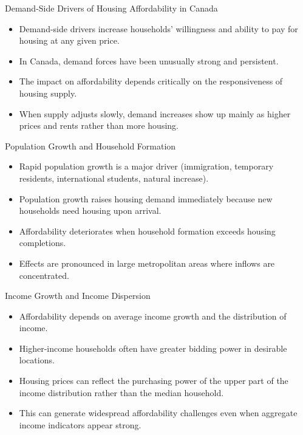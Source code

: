 \documentclass[aspectratio=169]{beamer}
\begin{document}
\begin{frame}{Demand-Side Drivers of Housing Affordability in Canada}
\transfade
\begin{itemize}
  \item Demand-side drivers increase households' willingness and ability to pay for housing at any given price.
  \item In Canada, demand forces have been unusually strong and persistent.
  \item The impact on affordability depends critically on the responsiveness of housing supply.
  \item When supply adjusts slowly, demand increases show up mainly as higher prices and rents rather than more housing.
\end{itemize}
\end{frame}

\begin{frame}{Population Growth and Household Formation}
\transfade
\begin{itemize}
  \item Rapid population growth is a major driver (immigration, temporary residents, international students, natural increase).
  \item Population growth raises housing demand immediately because new households need housing upon arrival.
  \item Affordability deteriorates when household formation exceeds housing completions.
  \item Effects are pronounced in large metropolitan areas where inflows are concentrated.
\end{itemize}
\end{frame}

\begin{frame}{Income Growth and Income Dispersion}
\transfade
\begin{itemize}
  \item Affordability depends on average income growth and the distribution of income.
  \item Higher-income households often have greater bidding power in desirable locations.
  \item Housing prices can reflect the purchasing power of the upper part of the income distribution rather than the median household.
  \item This can generate widespread affordability challenges even when aggregate income indicators appear strong.
\end{itemize}
\end{frame}
\end{document}
